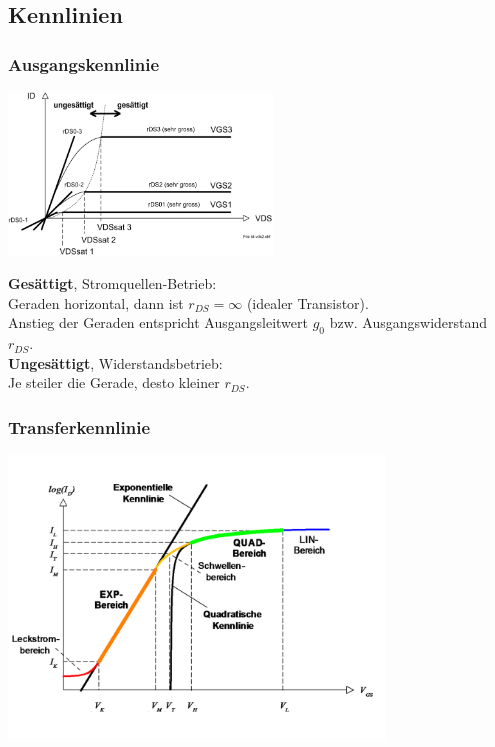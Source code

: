 \subsection{Kennlinien}
\subsubsection{Ausgangskennlinie}
\begin{minipage}{8cm}
	\centering
	\includegraphics[width=7cm]{images/Ausgangskennlinie.png}
\end{minipage}
\begin{minipage}{10cm}
	\textbf{Gesättigt}, Stromquellen-Betrieb:\\
	Geraden horizontal, dann ist $r_{DS}=\infty$ (idealer Transistor). \\
	Anstieg der Geraden entspricht Ausgangsleitwert $g_0$ bzw. Ausgangswiderstand $r_{DS}$. \\
	
	\textbf{Ungesättigt}, Widerstandsbetrieb: \\
	Je steiler die Gerade, desto kleiner $r_{DS}$. \\
	
	{ \centering 
	\hspace{5mm}
	}

\end{minipage}

\subsubsection{Transferkennlinie}
{	\centering
	\qquad\qquad
		\includegraphics[width=10cm]{images/Transferkennlinie.png}
} \\

